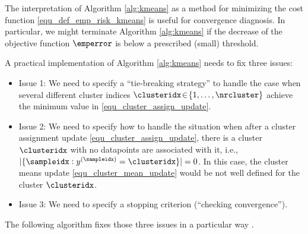 \documentclass[12pt]{report}
\begin{document}
The interpretation of Algorithm \ref{alg:kmeans} as a method for 
minimizing the cost function \eqref{equ_def_emp_risk_kmeans} is 
useful for convergence diagnosis. In particular, we might terminate 
Algorithm \ref{alg:kmeans} if the decrease of the objective function 
$\emperror$ is below a prescribed (small) threshold. 
 
A practical implementation of Algorithm \ref{alg:kmeans} needs to fix three issues: 
\begin{itemize} 
\item Issue 1: We need to specify a ``tie-breaking strategy'' to 
handle the case when several different cluster indices 
$\clusteridx\!\in\!\{1,\ldots,\nrcluster\}$ achieve the minimum 
value in \eqref{equ_cluster_assign_update}. 
\item Issue 2: We need to specify how to handle the situation 
when after a cluster assignment update  \eqref{equ_cluster_assign_update}, 
there is a cluster $\clusteridx$ with no datapoints are associated 
with it, i.e., $|\{ \sampleidx: y^{(\sampleidx)} = \clusteridx \}|=0$. 
In this case, the cluster means update \eqref{equ_cluster_mean_update} 
would be not well defined for the cluster $\clusteridx$. 
\item Issue 3: We need to specify a stopping criterion (``checking convergence''). 
\end{itemize}
The following algorithm fixes those three issues in a particular way \cite{Gray1980}.  
\end{document}
